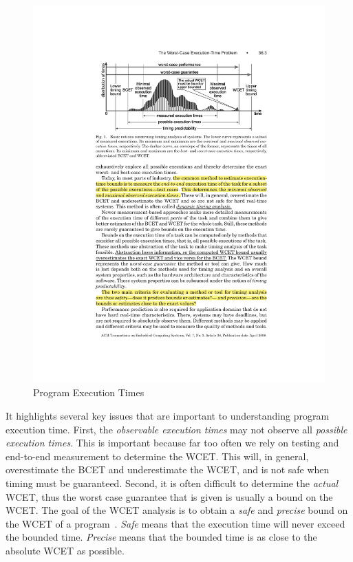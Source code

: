 \begin{figure}[h]
  \begin{center}
    \includegraphics{figs/program_executiontimes.pdf}
  \end{center}
  \vspace{-3mm}
  \caption{Program Execution Times~\cite{wilhelm-survey-paper}}
  \label{fig:program_execution_times}
\end{figure}

It highlights several key issues that are important to understanding program execution time.
First, the \emph{observable execution times} may not observe all \emph{possible execution times}.
This is important because far too often we rely on testing and end-to-end measurement to determine the WCET.
This will, in general, overestimate the BCET and underestimate the WCET, and is not safe when timing must be guaranteed. 
Second, it is often difficult to determine the \emph{actual} WCET, thus the worst case guarantee that is given is usually a bound on the WCET.    
The goal of the WCET analysis is to obtain a \textit{safe} and \textit{precise} bound on the WCET of a program~\cite{wilhelm-survey-paper}. 
\textit{Safe} means that the execution time will never exceed the bounded time. 
\textit{Precise} means that the bounded time is as close to the absolute WCET as possible. 

